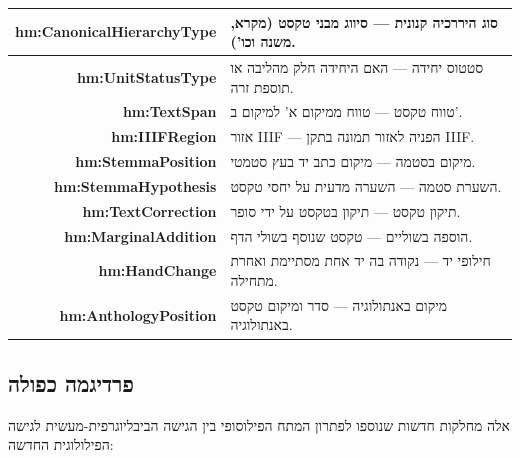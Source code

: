 \documentclass[12pt,a4paper]{article}
\newcommand{\new}[1]{\textcolor{newaddition}{#1}}
\newcommand{\newclass}[1]{\textcolor{newaddition}{\textbf{#1}}}
\begin{document}
\begin{longtable}{|r|p{10cm}|}
\newclass{hm:CanonicalHierarchyType} & 
\new{סוג היררכיה קנונית — סיווג מבני טקסט (מקרא, משנה וכו').}\\
\hline

\newclass{hm:UnitStatusType} & 
\new{סטטוס יחידה — האם היחידה חלק מהליבה או תוספת זרה.}\\
\hline

\newclass{hm:TextSpan} & 
\new{טווח טקסט — טווח ממיקום א' למיקום ב'.}\\
\hline

\newclass{hm:IIIFRegion} & 
\new{אזור IIIF — הפניה לאזור תמונה בתקן IIIF.}\\
\hline

\newclass{hm:StemmaPosition} & 
\new{מיקום בסטמה — מיקום כתב יד בעץ סטמטי.}\\
\hline

\newclass{hm:StemmaHypothesis} & 
\new{השערת סטמה — השערה מדעית על יחסי טקסט.}\\
\hline

\newclass{hm:TextCorrection} & 
\new{תיקון טקסט — תיקון בטקסט על ידי סופר.}\\
\hline

\newclass{hm:MarginalAddition} & 
\new{הוספה בשוליים — טקסט שנוסף בשולי הדף.}\\
\hline

\newclass{hm:HandChange} & 
\new{חילופי יד — נקודה בה יד אחת מסתיימת ואחרת מתחילה.}\\
\hline

\newclass{hm:AnthologyPosition} & 
\new{מיקום באנתולוגיה — סדר ומיקום טקסט באנתולוגיה.}\\
\hline
\end{longtable}

\subsection{\new{פרדיגמה כפולה}}

אלה מחלקות חדשות שנוספו לפתרון המתח הפילוסופי בין הגישה הביבליוגרפית-מעשית לגישה הפילולוגית החדשה:
\end{document}
